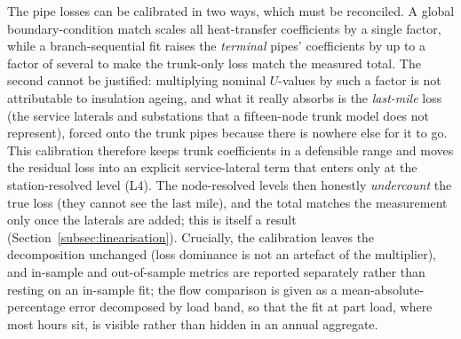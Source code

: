 \documentclass[a4paper,fleqn]{cas-sc}
\begin{document}
The pipe losses can be calibrated in two ways, which must be reconciled. A global
boundary-condition match scales all heat-transfer coefficients by a single factor, while a
branch-sequential fit raises the \emph{terminal} pipes' coefficients by up to a factor of
several to make the trunk-only loss match the measured total. The second cannot be justified:
multiplying nominal $U$-values by such a factor is not attributable to
insulation ageing, and what it really absorbs is the \emph{last-mile} loss (the service
laterals and substations that a fifteen-node trunk model does not represent), forced onto the
trunk pipes because there is nowhere else for it to go. This calibration therefore keeps trunk
coefficients in a defensible range and moves
the residual loss into an explicit service-lateral term that enters only at the station-resolved
level (L4). The node-resolved levels then honestly \emph{undercount} the true loss (they cannot
see the last mile), and the total matches the measurement only once the laterals are added; this
is itself a result (Section~\ref{subsec:linearisation}). Crucially, the calibration leaves
the decomposition unchanged (loss dominance is not an artefact of the multiplier), and
in-sample and out-of-sample metrics are reported separately rather than resting on an
in-sample fit; the flow comparison is given as a mean-absolute-percentage error
decomposed by load band, so that the fit at part load, where most hours sit, is visible
rather than hidden in an annual aggregate.
\end{document}

